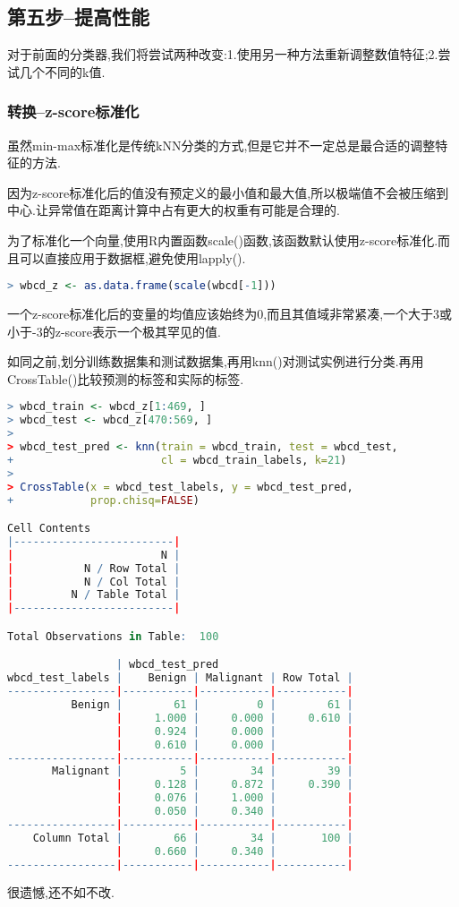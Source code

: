 \documentclass[11pt,a4paper,oneside]{book}
\begin{document}
\subsection{第五步--提高性能}
对于前面的分类器,我们将尝试两种改变:1.使用另一种方法重新调整数值特征;2.尝试几个不同的k值.
\subsubsection{转换--z-score标准化}
虽然min-max标准化是传统kNN分类的方式,但是它并不一定总是最合适的调整特征的方法.

因为z-score标准化后的值没有预定义的最小值和最大值,所以极端值不会被压缩到中心.让异常值在距离计算中占有更大的权重有可能是合理的.

为了标准化一个向量,使用R内置函数scale()函数,该函数默认使用z-score标准化.而且可以直接应用于数据框,避免使用lapply().
\begin{lstlisting}[language=r]
> wbcd_z <- as.data.frame(scale(wbcd[-1]))
\end{lstlisting}
一个z-score标准化后的变量的均值应该始终为0,而且其值域非常紧凑,一个大于3或小于-3的z-score表示一个极其罕见的值.

如同之前,划分训练数据集和测试数据集,再用knn()对测试实例进行分类.再用CrossTable()比较预测的标签和实际的标签.
\begin{lstlisting}[language=r]
> wbcd_train <- wbcd_z[1:469, ]
> wbcd_test <- wbcd_z[470:569, ]
> 
> wbcd_test_pred <- knn(train = wbcd_train, test = wbcd_test,
+                       cl = wbcd_train_labels, k=21)
> 
> CrossTable(x = wbcd_test_labels, y = wbcd_test_pred,
+            prop.chisq=FALSE)

Cell Contents
|-------------------------|
|                       N |
|           N / Row Total |
|           N / Col Total |
|         N / Table Total |
|-------------------------|

Total Observations in Table:  100 

                 | wbcd_test_pred 
wbcd_test_labels |    Benign | Malignant | Row Total | 
-----------------|-----------|-----------|-----------|
          Benign |        61 |         0 |        61 | 
                 |     1.000 |     0.000 |     0.610 | 
                 |     0.924 |     0.000 |           | 
                 |     0.610 |     0.000 |           | 
-----------------|-----------|-----------|-----------|
       Malignant |         5 |        34 |        39 | 
                 |     0.128 |     0.872 |     0.390 | 
                 |     0.076 |     1.000 |           | 
                 |     0.050 |     0.340 |           | 
-----------------|-----------|-----------|-----------|
    Column Total |        66 |        34 |       100 | 
                 |     0.660 |     0.340 |           | 
-----------------|-----------|-----------|-----------|
\end{lstlisting}
很遗憾,还不如不改.
\end{document}
